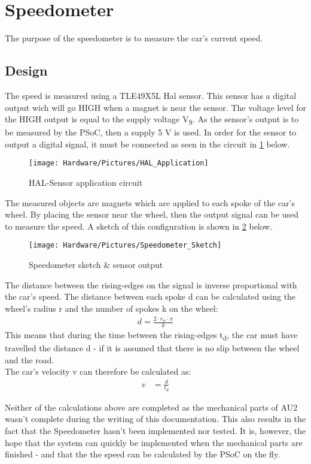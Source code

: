 \newpage
\section{Speedometer}
The purpose of the speedometer is to measure the car's current speed.

\subsection{Design}
The speed is measured using a TLE49X5L Hal sensor\cite{TLE4905}. This sensor has a digital output wich will go HIGH when a magnet is near the sensor. The voltage level for the HIGH output is equal to the supply voltage V\textsubscript{S}. As the sensor's output is to be measured by the PSoC, then a supply 5 V is used.
In order for the sensor to output a digital signal, it must be connected as seen in the circuit in \ref{fig:HAL_application} below.

\begin{figure}[H]
	\centering
	\texttt{[image: Hardware/Pictures/HAL\_Application]}
	\caption{HAL-Sensor application circuit}
	\label{fig:HAL_application}
\end{figure}

The measured objects are magnets which are applied to each spoke of the car's wheel. By placing the sensor near the wheel, then the output signal can be used to measure the speed. A sketch of this configuration is shown in \ref{fig:Speed_sketch} below.

\begin{figure}[H]
	\centering
	\texttt{[image: Hardware/Pictures/Speedometer\_Sketch]}
	\caption{Speedometer sketch \& sensor output}
	\label{fig:Speed_sketch}
\end{figure}

\newpage
The distance between the rising-edges on the signal is inverse proportional with the car's speed. The distance between each spoke d can be calculated using the wheel's radius r and the number of spokes k on the wheel:
\begin{align}
		d = \frac{2 \cdot r_w \cdot \pi}{k}
\end{align}
This means that during the time between the rising-edges t\textsubscript{d}, the car must have travelled the distance d - if it is assumed that there is no slip between the wheel and the road.\\
The car's velocity v can therefore be calculated as:
\begin{align}
		v &= \frac{d}{t_d}
\end{align}

Neither of the calculations above are completed as the mechanical parts of AU2 wasn't complete during the writing of this documentation. This also results in the fact that the Speedometer hasn't been implemented nor tested. It is, however, the hope that the system can quickly be implemented when the mechanical parts are finished - and that the the speed can be calculated by the PSoC on the fly. 